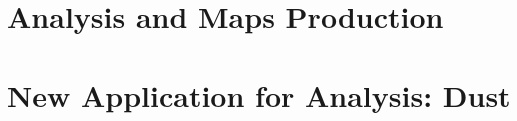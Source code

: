 \documentclass[a4paper,11pt,twoside]{book}
\begin{document}
\chapter{Analysis and Maps Production}



\chapter{New Application for Analysis: Dust}





\backmatter
{}

\printbibliography
\end{document}
